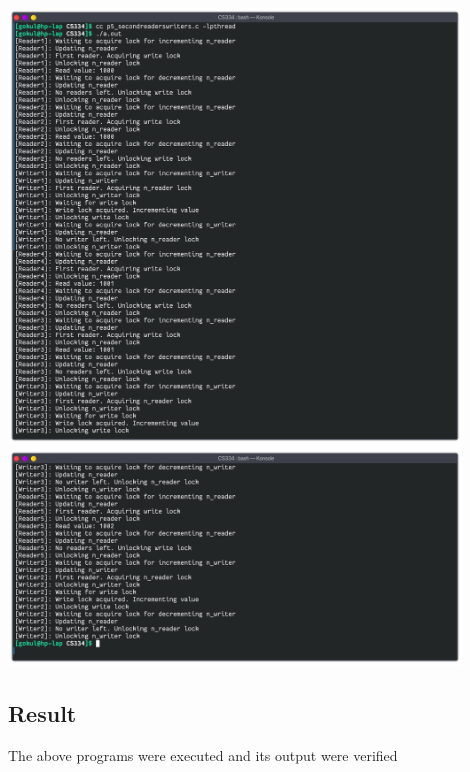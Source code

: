 \begin{center}
	\includegraphics[width=0.90\textwidth]{img/p6/ss1.png}
	\includegraphics[width=0.90\textwidth]{img/p6/ss2.png}
\end{center}


\subsection{Result}
The above programs were executed and its output were verified